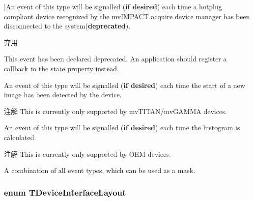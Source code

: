 \begin{Desc}
\begin{description}
{}]An event of this type will be signalled ({\bfseries if desired}) each time a hotplug compliant device recognized by the mv\+I\+M\+P\+A\+C\+T acquire device manager has been disconnected to the system({\bfseries deprecated}). \begin{DoxyRefDesc}{弃用}
\item[\hyperlink{deprecated__deprecated000003}{弃用}]This event has been declared deprecated. An application should register a callback to the state property instead. \end{DoxyRefDesc}
\item[{\em 
\hypertarget{group___common_interface_gga0947eb7d6a73b9baab283cbf65cd8d6ba47f3a4c4f121f12d9eeef13a080199ae}{det\+Frame\+Start}\label{group___common_interface_gga0947eb7d6a73b9baab283cbf65cd8d6ba47f3a4c4f121f12d9eeef13a080199ae}
}]An event of this type will be signalled ({\bfseries if desired}) each time the start of a new image has been detected by the device. \begin{DoxyNote}{注解}
This is currently only supported by mv\+T\+I\+T\+A\+N/mv\+G\+A\+M\+M\+A devices. 
\end{DoxyNote}
\item[{\em 
\hypertarget{group___common_interface_gga0947eb7d6a73b9baab283cbf65cd8d6bacd0d2755cf23862c616cff1d3da5e57b}{det\+Histogram\+Ready}\label{group___common_interface_gga0947eb7d6a73b9baab283cbf65cd8d6bacd0d2755cf23862c616cff1d3da5e57b}
}]An event of this type will be signalled ({\bfseries if desired}) each time the histogram is calculated. \begin{DoxyNote}{注解}
This is currently only supported by O\+E\+M devices. 
\end{DoxyNote}
\item[{\em 
\hypertarget{group___common_interface_gga0947eb7d6a73b9baab283cbf65cd8d6badbc38721cba54c6ead7d62dc6321b2da}{det\+All}\label{group___common_interface_gga0947eb7d6a73b9baab283cbf65cd8d6badbc38721cba54c6ead7d62dc6321b2da}
}]A combination of all event types, which can be used as a mask. \end{description}
\end{Desc}
\hypertarget{group___common_interface_ga8206c9f9a594b7c21b43aaa624a86220}{
\subsubsection[{T\+Device\+Interface\+Layout}]{\setlength{\rightskip}{0pt plus 5cm}enum {\bf T\+Device\+Interface\+Layout}}}\label{group___common_interface_ga8206c9f9a594b7c21b43aaa624a86220}


